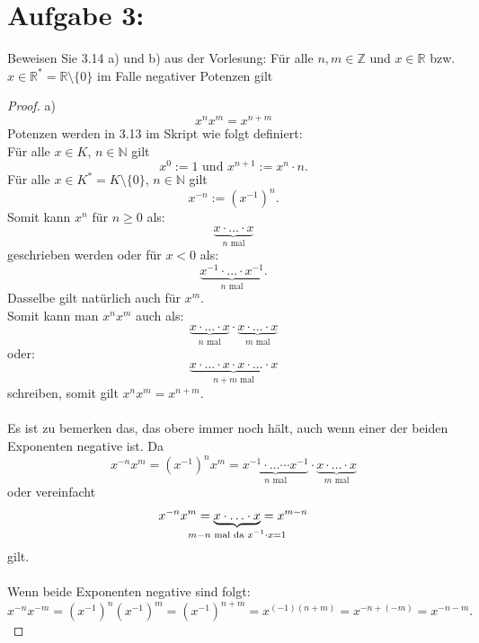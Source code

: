 \documentclass{../problemset}
\begin{document}
\section*{Aufgabe 3:}
Beweisen Sie 3.14 a) und b) aus der Vorlesung:
\newline\newline
Für alle $n,m \in \mathbb{Z}$ und $x \in \mathbb{R}$ bzw. $x \in \mathbb{R}^* = \mathbb{R}\setminus\{0\}$ im Falle negativer Potenzen gilt
\begin{proof}
	a)
	\begin{displaymath}
		x^nx^m = x^{n+m}
	\end{displaymath}
	Potenzen werden in 3.13 im Skript wie folgt definiert: \\
	Für alle $x \in K$, $n \in \mathbb{N}$ gilt
	\[
		x^0 := 1 \text{ und } x^{n+1}:=x^n \cdot n.
	\]
	Für alle $x \in K^*=K\setminus\{0\}$, $n \in \mathbb{N}$ gilt \[
		x^{-n} := (x^{-1})^n.
	\]
	Somit kann $x^n$ für $n \ge 0$ als: \[
		\underbrace{x \cdot \ldots \cdot x}_{n\text{ mal}}
	\] geschrieben werden oder für $x < 0$ als: \[
		\underbrace{x^{-1} \cdot \ldots \cdot x^{-1}}_{n\text{ mal}}.
	\]
	Dasselbe gilt natürlich auch für $x^m$. \\
	Somit kann man $x^nx^m$ auch als: \[
		\underbrace{x \cdot \ldots \cdot x}_{n\text{ mal}} \cdot \underbrace{x \cdot \ldots \cdot x}_{m\text{ mal}}
	\] oder: \[
		\underbrace{x \cdot \ldots \cdot x \cdot x \cdot \ldots \cdot x}_{n+m\text{ mal}}
	\] schreiben, somit gilt $x^nx^m = x^{n+m}$. \\
	\\
	Es ist zu bemerken das, das obere immer noch hält, auch wenn einer der beiden Exponenten negative ist.
	Da \[
		x^{-n}x^m = {(x^{-1})}^nx^m = \underbrace{x^{-1} \cdot\ldots\cdots x^{-1}}_{n\text{ mal}} \cdot \underbrace{x \cdot \ldots \cdot x}_{m\text{ mal}}
	\] oder vereinfacht \[
		x^{-n}x^m = \underbrace{x \cdot \ldots \cdot x}_{\mathclap{m - n\text{ mal da } x^{-1} \cdot x = 1}} = x^{m-n}
	\] gilt. \\
	\\
	Wenn beide Exponenten negative sind folgt: \[
		x^{-n}x^{-m} = {(x^{-1})}^n{(x^{-1})}^m = {(x^{-1})}^{n+m} = x^{(-1)(n+m)} = x^{-n+(-m)} = x^{-n-m}.
	\]
\end{proof}
\end{document}
